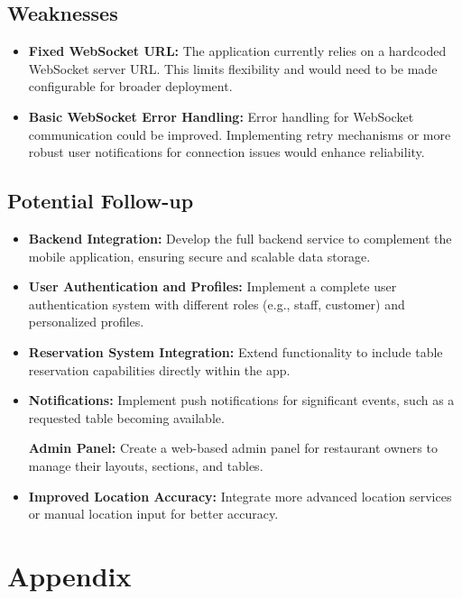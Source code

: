 \documentclass{article}
\begin{document}
\subsection{Weaknesses}
\begin{itemize}
    \item \textbf{Fixed WebSocket URL:} The application currently relies on a hardcoded WebSocket server URL. This limits flexibility and would need to be made configurable for broader deployment.

    \item \textbf{Basic WebSocket Error Handling:} Error handling for WebSocket communication could be improved. Implementing retry mechanisms or more robust user notifications for connection issues would enhance reliability.
\end{itemize}

\subsection{Potential Follow-up}
\begin{itemize}
    \item \textbf{Backend Integration:} Develop the full backend service to complement the mobile application, ensuring secure and scalable data storage.

    \item \textbf{User Authentication and Profiles:} Implement a complete user authentication system with different roles (e.g., staff, customer) and personalized profiles.

    \item \textbf{Reservation System Integration:} Extend functionality to include table reservation capabilities directly within the app.

    \item \textbf{Notifications:} Implement push notifications for significant events, such as a requested table becoming available.

    \textbf{Admin Panel:} Create a web-based admin panel for restaurant owners to manage their layouts, sections, and tables.

    \item \textbf{Improved Location Accuracy:} Integrate more advanced location services or manual location input for better accuracy.
\end{itemize}

\appendix
\section*{Appendix}
\end{document}
